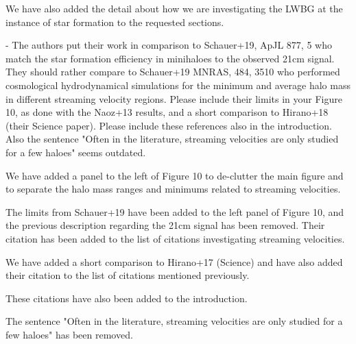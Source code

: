 \documentclass[11pt]{article}
\newenvironment{referee}[1][]{%
    \ignorespaces%
    \begin{mdframed}[style=myquotestyle,#1]%
}{%
    \end{mdframed}%
    \ignorespacesafterend%
}%
\begin{document}
    We have also added the detail about how we are investigating the LWBG at the instance of star formation to the requested sections.

\begin{referee}
    - The authors put their work in comparison to Schauer+19, ApJL 877, 5 who match the star formation efficiency in minihaloes to the observed 21cm signal. They should rather compare to Schauer+19 MNRAS, 484, 3510 who performed cosmological hydrodynamical simulations for the minimum and average halo mass in different streaming velocity regions. Please include their limits in your Figure 10, as done with the Naoz+13 results, and a short comparison to Hirano+18 (their Science paper). Please include these references also in the introduction. Also the sentence "Often in the literature, streaming velocities are only studied for a few haloes" seems outdated.
\end{referee}
    We have added a panel to the left of Figure 10 to de-clutter the main figure and to separate the halo mass ranges and minimums related to streaming velocities. 
    
    The limits from Schauer+19 have been added to the left panel of Figure 10, and the previous description regarding the 21cm signal has been removed. Their citation has been added to the list of citations investigating streaming velocities. 

    We have added a short comparison to Hirano+17 (Science) and have also added their citation to the list of citations mentioned previously. 
    
    These citations have also been added to the introduction.

	The sentence "Often in the literature, streaming velocities are only studied for a few haloes" has been removed.
    
\end{document}
